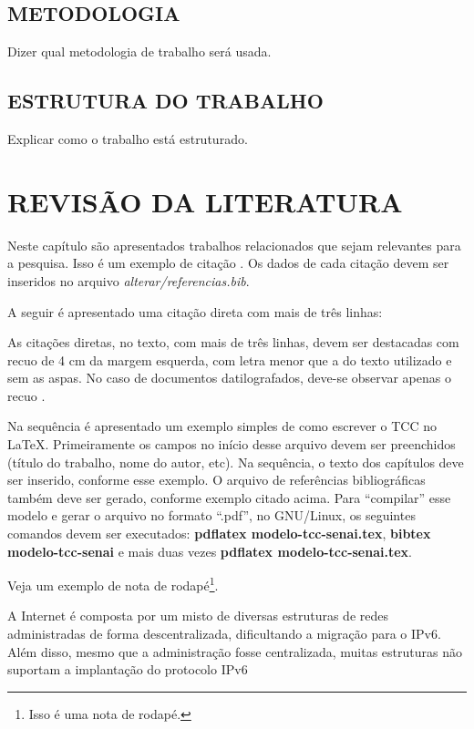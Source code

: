 \documentclass[
	12pt,				%
	openright,			%
	oneside,			%
	a4paper,			%
	chapter=TITLE,		%
	section=TITLE,		%
	english,			%
	french,				%
	spanish,			%
	brazil				%
	]{abntex2}
\begin{document}
\section{METODOLOGIA}

Dizer qual metodologia de trabalho será usada.

\section{ESTRUTURA DO TRABALHO}

Explicar como o trabalho está estruturado.

\chapter{REVISÃO DA LITERATURA}\label{cap-revisao}

Neste capítulo são apresentados trabalhos relacionados que sejam relevantes para a pesquisa. Isso é um exemplo de citação . Os dados de cada citação devem ser inseridos no arquivo \textit{alterar/referencias.bib}.

A seguir é apresentado uma citação direta com mais de três linhas:

\begin{citacao}
As citações diretas, no texto, com mais de três linhas, devem ser destacadas com recuo de 4 cm da margem esquerda, com letra menor que a do texto utilizado e sem as aspas. No caso de documentos datilografados, deve-se observar apenas o recuo \cite[p. 10]{NBR10520:2002}.
\end{citacao}

Na sequência é apresentado um exemplo simples de como escrever o TCC no \LaTeX. Primeiramente os campos no início desse arquivo devem ser preenchidos (título do trabalho, nome do autor, etc). Na sequência, o texto dos capítulos deve ser inserido, conforme esse exemplo. O arquivo de referências bibliográficas também deve ser gerado, conforme exemplo citado acima. Para ``compilar'' esse modelo e gerar o arquivo no formato ``.pdf'', no GNU/Linux, os seguintes comandos devem ser executados: \textbf{pdflatex modelo-tcc-senai.tex}, \textbf{bibtex modelo-tcc-senai} e mais duas vezes \textbf{pdflatex modelo-tcc-senai.tex}. 

Veja um exemplo de nota de rodapé\footnote{Isso é uma nota de rodapé.}.

\begin{citacao}
A Internet é composta por um misto de diversas estruturas de redes administradas 
de forma descentralizada, dificultando a migração para o IPv6. Além disso, mesmo que 
a administração fosse centralizada, muitas estruturas não suportam a implantação do 
protocolo IPv6 \cite{martini2003analise}
\end{citacao}
\end{document}
